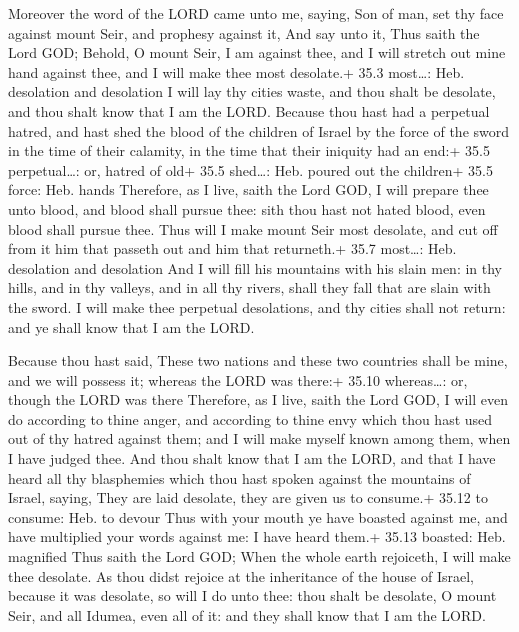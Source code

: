  Moreover the word of the LORD came unto me, saying,
 Son of man, set thy face against mount Seir, and prophesy
against it,  And say unto it, Thus saith the Lord GOD;
Behold, O mount Seir, I am against thee, and I will stretch out mine
hand against thee, and I will make thee most desolate.+ 35.3 most\ldots:
Heb. desolation and desolation  I will lay thy cities waste,
and thou shalt be desolate, and thou shalt know that I am the LORD.
 Because thou hast had a perpetual hatred, and hast shed the
blood of the children of Israel by the force of the sword in the time of
their calamity, in the time that their iniquity had an end:+ 35.5
perpetual\ldots: or, hatred of old+ 35.5 shed\ldots: Heb. poured out the
children+ 35.5 force: Heb. hands  Therefore, as I live,
saith the Lord GOD, I will prepare thee unto blood, and blood shall
pursue thee: sith thou hast not hated blood, even blood shall pursue
thee.  Thus will I make mount Seir most desolate, and cut
off from it him that passeth out and him that returneth.+ 35.7
most\ldots: Heb. desolation and desolation  And I will fill
his mountains with his slain men: in thy hills, and in thy valleys, and
in all thy rivers, shall they fall that are slain with the sword.
 I will make thee perpetual desolations, and thy cities
shall not return: and ye shall know that I am the LORD.

 Because thou hast said, These two nations and these two
countries shall be mine, and we will possess it; whereas the LORD was
there:+ 35.10 whereas\ldots: or, though the LORD was there 
Therefore, as I live, saith the Lord GOD, I will even do according to
thine anger, and according to thine envy which thou hast used out of thy
hatred against them; and I will make myself known among them, when I
have judged thee.  And thou shalt know that I am the LORD,
and that I have heard all thy blasphemies which thou hast spoken against
the mountains of Israel, saying, They are laid desolate, they are given
us to consume.+ 35.12 to consume: Heb. to devour  Thus with
your mouth ye have boasted against me, and have multiplied your words
against me: I have heard them.+ 35.13 boasted: Heb. magnified
 Thus saith the Lord GOD; When the whole earth rejoiceth, I
will make thee desolate.  As thou didst rejoice at the
inheritance of the house of Israel, because it was desolate, so will I
do unto thee: thou shalt be desolate, O mount Seir, and all Idumea, even
all of it: and they shall know that I am the LORD.

